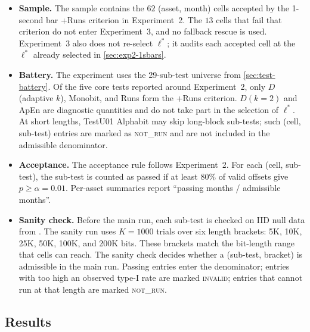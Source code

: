 \documentclass[11pt,titlepage,openany,oneside]{book}  %
\begin{document}
\begin{itemize}
\item \textbf{Sample.} The sample contains the $62$ (asset, month) cells accepted by the 1-second bar +Runs criterion in Experiment~2. The $13$ cells that fail that criterion do not enter Experiment~3, and no fallback rescue is used. Experiment~3 also does not re-select $\ell^*$; it audits each accepted cell at the $\ell^*$ already selected in \cref{sec:exp2-1sbars}.

\item \textbf{Battery.} The experiment uses the 29-sub-test universe from \cref{sec:test-battery}. Of the five core tests reported around Experiment~2, only $D$ (adaptive $k$), Monobit, and Runs form the +Runs criterion. $D(k=2)$ and ApEn are diagnostic quantities and do not take part in the selection of $\ell^*$. At short lengths, TestU01 Alphabit may skip long-block sub-tests; such (cell, sub-test) entries are marked as \textsc{not\_run} and are not included in the admissible denominator.

\item \textbf{Acceptance.} The acceptance rule follows Experiment~2. For each (cell, sub-test), the sub-test is counted as passed if at least $80\%$ of valid offsets give $p \geq \alpha = 0.01$. Per-asset summaries report ``passing months / admissible months''.

\item \textbf{Sanity check.} Before the main run, each sub-test is checked on IID null data from . The sanity run uses $K = 1000$ trials over six length brackets: 5K, 10K, 25K, 50K, 100K, and 200K bits. These brackets match the bit-length range that cells can reach. The sanity check decides whether a (sub-test, bracket) is admissible in the main run. Passing entries enter the denominator; entries with too high an observed type-I rate are marked \textsc{invalid}; entries that cannot run at that length are marked \textsc{not\_run}.

\end{itemize}

\subsection{Results}
\label{sec:exp3-results}
\end{document}
